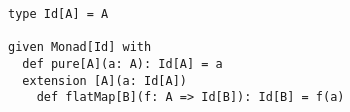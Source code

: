 \begin{algorithm}

\begin{verbatim}
type Id[A] = A
      
given Monad[Id] with
  def pure[A](a: A): Id[A] = a
  extension [A](a: Id[A])
    def flatMap[B](f: A => Id[B]): Id[B] = f(a)
\end{verbatim}

\caption{Identity monad in Scala. %
\label{monad:id}}
\end{algorithm}